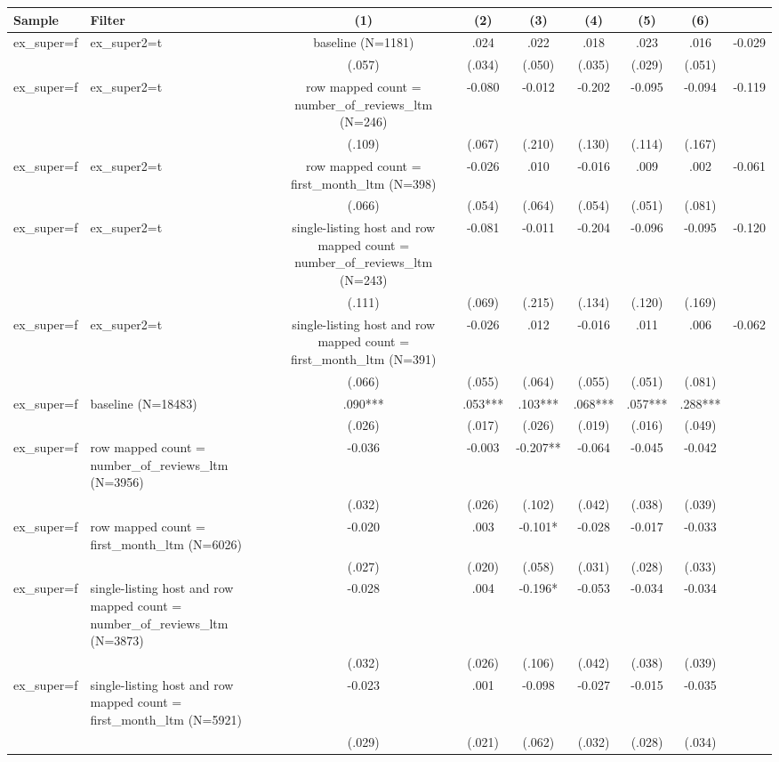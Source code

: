 \begin{tabular}{llcccccc}
\hline
Sample & Filter & (1) & (2) & (3) & (4) & (5) & (6) \\
\hline
ex_super=f & ex_super2=t & baseline (N=1181) & .024 & .022 & .018 & .023 & .016 & -0.029
\\
 &  & (.057) & (.034) & (.050) & (.035) & (.029) & (.051)
\\
ex_super=f & ex_super2=t & row mapped count = number_of_reviews_ltm (N=246) & -0.080 & -0.012 & -0.202 & -0.095 & -0.094 & -0.119
\\
 &  & (.109) & (.067) & (.210) & (.130) & (.114) & (.167)
\\
ex_super=f & ex_super2=t & row mapped count = first_month_ltm (N=398) & -0.026 & .010 & -0.016 & .009 & .002 & -0.061
\\
 &  & (.066) & (.054) & (.064) & (.054) & (.051) & (.081)
\\
ex_super=f & ex_super2=t & single-listing host and row mapped count = number_of_reviews_ltm (N=243) & -0.081 & -0.011 & -0.204 & -0.096 & -0.095 & -0.120
\\
 &  & (.111) & (.069) & (.215) & (.134) & (.120) & (.169)
\\
ex_super=f & ex_super2=t & single-listing host and row mapped count = first_month_ltm (N=391) & -0.026 & .012 & -0.016 & .011 & .006 & -0.062
\\
 &  & (.066) & (.055) & (.064) & (.055) & (.051) & (.081)
\\
ex_super=f & baseline (N=18483) & .090*** & .053*** & .103*** & .068*** & .057*** & .288***
\\
 &  & (.026) & (.017) & (.026) & (.019) & (.016) & (.049)
\\
ex_super=f & row mapped count = number_of_reviews_ltm (N=3956) & -0.036 & -0.003 & -0.207** & -0.064 & -0.045 & -0.042
\\
 &  & (.032) & (.026) & (.102) & (.042) & (.038) & (.039)
\\
ex_super=f & row mapped count = first_month_ltm (N=6026) & -0.020 & .003 & -0.101* & -0.028 & -0.017 & -0.033
\\
 &  & (.027) & (.020) & (.058) & (.031) & (.028) & (.033)
\\
ex_super=f & single-listing host and row mapped count = number_of_reviews_ltm (N=3873) & -0.028 & .004 & -0.196* & -0.053 & -0.034 & -0.034
\\
 &  & (.032) & (.026) & (.106) & (.042) & (.038) & (.039)
\\
ex_super=f & single-listing host and row mapped count = first_month_ltm (N=5921) & -0.023 & .001 & -0.098 & -0.027 & -0.015 & -0.035
\\
 &  & (.029) & (.021) & (.062) & (.032) & (.028) & (.034)
\\
\hline
\end{tabular}
